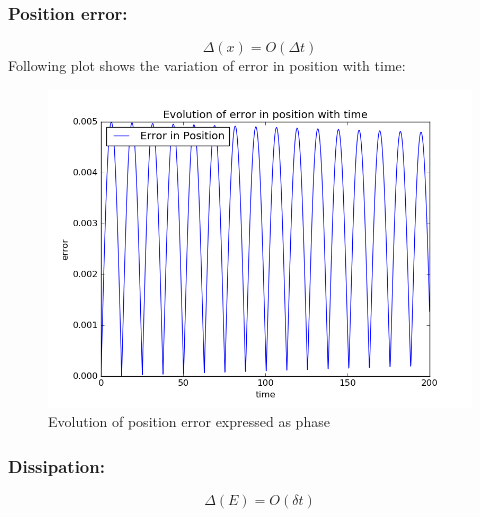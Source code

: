 \documentclass[11pt, a4paper]{article}
\begin{document}
\subsubsection{Position error:}
\begin{equation}
 \Delta (x) = O(\Delta t)
\end{equation}
Following plot shows the variation of error in position with time:
\begin{figure}[H]
 \centering
 \includegraphics[scale = 0.5]{Bor_err_pos_1.png}
 \caption{Evolution of position error expressed as phase}
\end{figure}


\subsubsection{Dissipation:}
\begin{equation}
 \Delta (E) = O (\delta t)
\end{equation}
\end{document}
